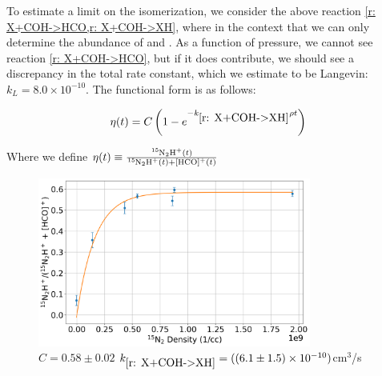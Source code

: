 To estimate a limit on the isomerization, we consider the above reaction \cref{r: X+COH->HCO,r: X+COH->XH}, where  in the context that we can only determine the abundance of \ce{[HCO]+} and . As a function of pressure, we cannot see reaction \ref{r: X+COH->HCO}, but if it does contribute, we should see a discrepancy in the total rate constant, which we estimate to be Langevin: $k_L = 8.0 \times 10^{-10}$. The functional form is as follows:


\begin{equation}
	\eta(t) = C \left( 1-e^{-k_{\ref{r: X+COH->XH}} \rho t} \right)
\end{equation}

Where we define $\eta(t) \equiv \frac{\ce{^{15}N2H+}(t)}{\ce{^{15}N2H+}(t)+\ce{[HCO]+}(t)}$

\begin{figure}[H]
	\centering
	\label{fig: N2 pressure scan}
	\includegraphics[width=0.8\textwidth]{images/N2_pressure_scan.png}
	\caption{$C = 0.58 \pm 0.02$ $k_{\ref{r: X+COH->XH}} = ((6.1 \pm 1.5) \times 10^{-10})$cm$^3$/s}
\end{figure}